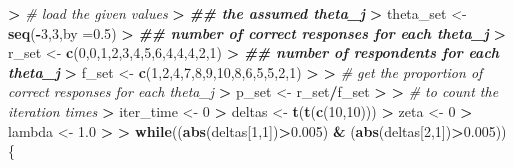 \documentclass[
]{article}
\newenvironment{Shaded}{\begin{snugshade}}{\end{snugshade}}
\newcommand{\AttributeTok}[1]{\textcolor[rgb]{0.13,0.29,0.53}{#1}}
\newcommand{\CommentTok}[1]{\textcolor[rgb]{0.56,0.35,0.01}{\textit{#1}}}
\newcommand{\ControlFlowTok}[1]{\textcolor[rgb]{0.13,0.29,0.53}{\textbf{#1}}}
\newcommand{\DecValTok}[1]{\textcolor[rgb]{0.00,0.00,0.81}{#1}}
\newcommand{\DocumentationTok}[1]{\textcolor[rgb]{0.56,0.35,0.01}{\textbf{\textit{#1}}}}
\newcommand{\ErrorTok}[1]{\textcolor[rgb]{0.64,0.00,0.00}{\textbf{#1}}}
\newcommand{\FloatTok}[1]{\textcolor[rgb]{0.00,0.00,0.81}{#1}}
\newcommand{\FunctionTok}[1]{\textcolor[rgb]{0.13,0.29,0.53}{\textbf{#1}}}
\newcommand{\NormalTok}[1]{#1}
\newcommand{\OtherTok}[1]{\textcolor[rgb]{0.56,0.35,0.01}{#1}}
\newcommand{\SpecialCharTok}[1]{\textcolor[rgb]{0.81,0.36,0.00}{\textbf{#1}}}
\begin{document}
\begin{Shaded}
\begin{Highlighting}[]
\SpecialCharTok{\textgreater{}} \CommentTok{\# load the given values}
\ErrorTok{\textgreater{}} \DocumentationTok{\#\# the assumed theta\_j}
\ErrorTok{\textgreater{}}\NormalTok{ theta\_set }\OtherTok{\textless{}{-}} \FunctionTok{seq}\NormalTok{(}\SpecialCharTok{{-}}\DecValTok{3}\NormalTok{,}\DecValTok{3}\NormalTok{,}\AttributeTok{by =}\FloatTok{0.5}\NormalTok{)}
\SpecialCharTok{\textgreater{}} \DocumentationTok{\#\# number of correct responses for each theta\_j}
\ErrorTok{\textgreater{}}\NormalTok{ r\_set }\OtherTok{\textless{}{-}} \FunctionTok{c}\NormalTok{(}\DecValTok{0}\NormalTok{,}\DecValTok{0}\NormalTok{,}\DecValTok{1}\NormalTok{,}\DecValTok{2}\NormalTok{,}\DecValTok{3}\NormalTok{,}\DecValTok{4}\NormalTok{,}\DecValTok{5}\NormalTok{,}\DecValTok{6}\NormalTok{,}\DecValTok{4}\NormalTok{,}\DecValTok{4}\NormalTok{,}\DecValTok{4}\NormalTok{,}\DecValTok{2}\NormalTok{,}\DecValTok{1}\NormalTok{)}
\SpecialCharTok{\textgreater{}} \DocumentationTok{\#\# number of respondents for each theta\_j}
\ErrorTok{\textgreater{}}\NormalTok{ f\_set }\OtherTok{\textless{}{-}} \FunctionTok{c}\NormalTok{(}\DecValTok{1}\NormalTok{,}\DecValTok{2}\NormalTok{,}\DecValTok{4}\NormalTok{,}\DecValTok{7}\NormalTok{,}\DecValTok{8}\NormalTok{,}\DecValTok{9}\NormalTok{,}\DecValTok{10}\NormalTok{,}\DecValTok{8}\NormalTok{,}\DecValTok{6}\NormalTok{,}\DecValTok{5}\NormalTok{,}\DecValTok{5}\NormalTok{,}\DecValTok{2}\NormalTok{,}\DecValTok{1}\NormalTok{)}
\SpecialCharTok{\textgreater{}} 
\ErrorTok{\textgreater{}} \CommentTok{\# get the proportion of correct responses for each theta\_j}
\ErrorTok{\textgreater{}}\NormalTok{ p\_set }\OtherTok{\textless{}{-}}\NormalTok{ r\_set}\SpecialCharTok{/}\NormalTok{f\_set}
\SpecialCharTok{\textgreater{}} 
\ErrorTok{\textgreater{}} \CommentTok{\# to count the iteration times}
\ErrorTok{\textgreater{}}\NormalTok{ iter\_time }\OtherTok{\textless{}{-}} \DecValTok{0}
\SpecialCharTok{\textgreater{}}\NormalTok{ deltas }\OtherTok{\textless{}{-}} \FunctionTok{t}\NormalTok{(}\FunctionTok{t}\NormalTok{(}\FunctionTok{c}\NormalTok{(}\DecValTok{10}\NormalTok{,}\DecValTok{10}\NormalTok{)))}
\SpecialCharTok{\textgreater{}}\NormalTok{ zeta }\OtherTok{\textless{}{-}} \DecValTok{0}
\SpecialCharTok{\textgreater{}}\NormalTok{ lambda }\OtherTok{\textless{}{-}} \FloatTok{1.0}
\SpecialCharTok{\textgreater{}} 
\ErrorTok{\textgreater{}} \ControlFlowTok{while}\NormalTok{((}\FunctionTok{abs}\NormalTok{(deltas[}\DecValTok{1}\NormalTok{,}\DecValTok{1}\NormalTok{])}\SpecialCharTok{\textgreater{}}\FloatTok{0.005}\NormalTok{) }\SpecialCharTok{\&}\NormalTok{ (}\FunctionTok{abs}\NormalTok{(deltas[}\DecValTok{2}\NormalTok{,}\DecValTok{1}\NormalTok{])}\SpecialCharTok{\textgreater{}}\FloatTok{0.005}\NormalTok{)) \{}

\end{Highlighting}
\end{Shaded}
\end{document}

